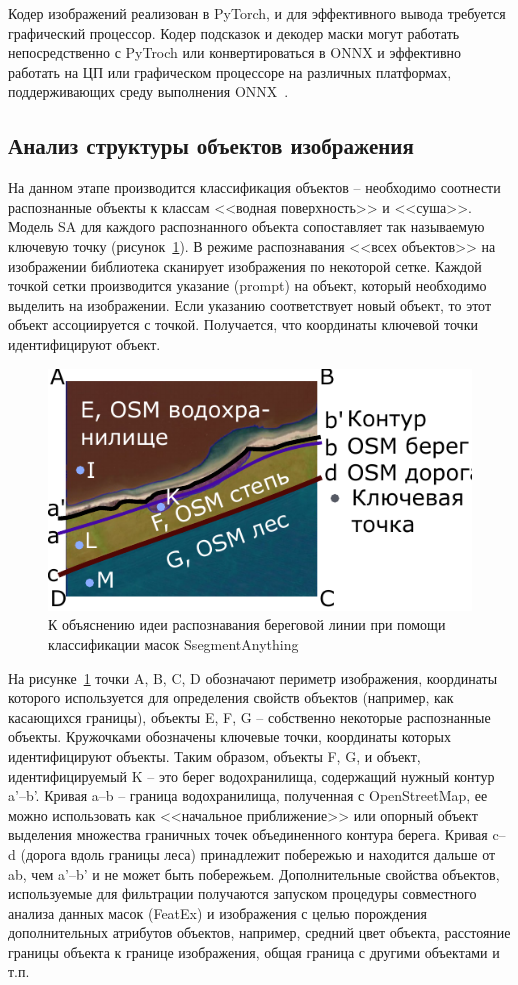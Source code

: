 \documentclass[732,fontsize=14pt,final]{studrep}
\begin{document}
Кодер изображений реализован в PyTorch, и для эффективного вывода требуется графический процессор. Кодер подсказок и декодер маски могут работать непосредственно с PyTroch или конвертироваться в ONNX и эффективно работать на ЦП или графическом процессоре на различных платформах, поддерживающих среду выполнения ONNX~\cite{samart}.

\subsection{Анализ структуры объектов изображения}

На данном этапе производится классификация объектов -- необходимо соотнести распознанные объекты к классам <<водная поверхность>> и <<суша>>. Модель SA для каждого распознанного объекта сопоставляет так называемую ключевую точку (рисунок~\ref{fig:objsanalysis}). В режиме распознавания <<всех объектов>> на изображении библиотека сканирует изображения по некоторой сетке. Каждой точкой сетки производится указание (prompt) на объект, который необходимо выделить на изображении. Если указанию соответствует новый объект, то этот объект ассоциируется с точкой. Получается, что координаты ключевой точки идентифицируют объект.

\begin{figure}
  \centering
  \includegraphics[width=0.7\linewidth]{pics/tracing-p.pdf}
  \caption{К объяснению идеи распознавания береговой линии при помощи классификации масок SsegmentAnything}\label{fig:objsanalysis}
\end{figure}

На рисунке~\ref{fig:objsanalysis} точки A, B, C, D обозначают периметр изображения, координаты которого используется для определения свойств объектов (например, как касающихся границы), объекты E, F, G -- собственно некоторые распознанные объекты. Кружочками обозначены ключевые точки, координаты которых идентифицируют объекты. Таким образом, объекты F, G, и объект, идентифицируемый K -- это берег водохранилища, содержащий нужный контур a’--b’. Кривая a--b -- граница водохранилища, полученная с OpenStreetMap, ее можно использовать как <<начальное приближение>> или опорный объект выделения множества граничных точек объединенного контура берега. Кривая c--d (дорога вдоль границы леса) принадлежит побережью и находится дальше от ab, чем a’--b’ и не может быть побережьем. Дополнительные свойства объектов, используемые для фильтрации получаются запуском процедуры совместного анализа данных масок (FeatEx) и изображения с целью порождения дополнительных атрибутов объектов, например, средний цвет объекта, расстояние границы объекта к границе изображения, общая граница с другими объектами и т.п.
\end{document}
